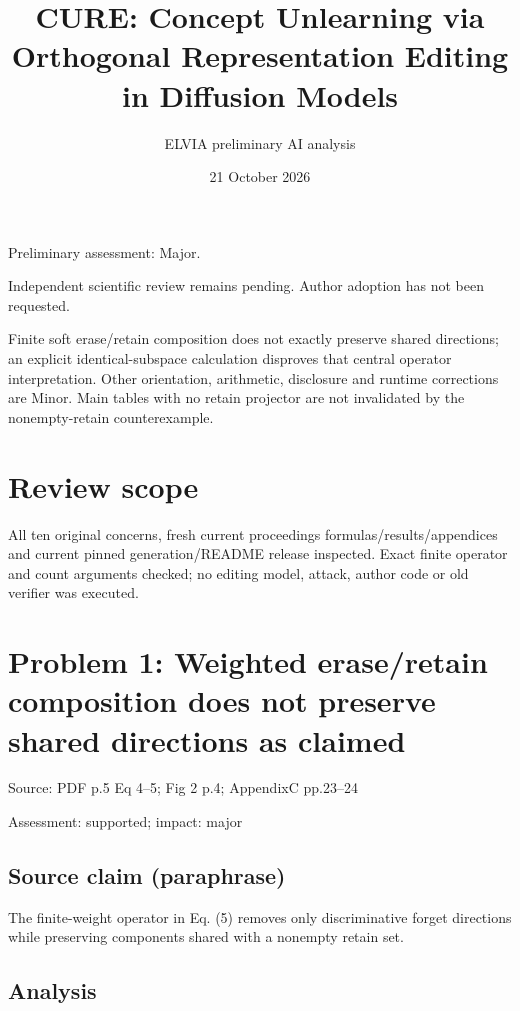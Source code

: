 \documentclass[11pt]{article}
\begin{document}
\title{CURE: Concept Unlearning via Orthogonal Representation Editing in Diffusion Models}

\author{ELVIA preliminary AI analysis}\date{21 October 2026}\maketitle

Preliminary assessment: Major.\par

Independent scientific review remains pending. Author adoption has not been requested.

Finite soft erase/retain composition does not exactly preserve shared directions; an explicit identical-subspace calculation disproves that central operator interpretation. Other orientation, arithmetic, disclosure and runtime corrections are Minor. Main tables with no retain projector are not invalidated by the nonempty-retain counterexample.

\section*{Review scope}

All ten original concerns, fresh current proceedings formulas/results/appendices and current pinned generation/README release inspected. Exact finite operator and count arguments checked; no editing model, attack, author code or old verifier was executed.

\section*{Problem 1: Weighted erase/retain composition does not preserve shared directions as claimed}

Source: PDF p.5 Eq 4–5; Fig 2 p.4; AppendixC pp.23–24

Assessment: supported; impact: major

\subsection*{Source claim (paraphrase)}

The finite-weight operator in Eq. (5) removes only discriminative forget directions while preserving components shared with a nonempty retain set.

\subsection*{Analysis}
\end{document}
